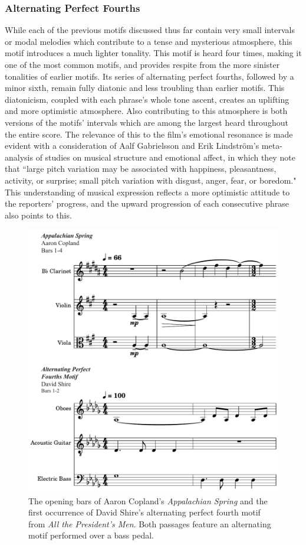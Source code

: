 \subsubsection{Alternating Perfect Fourths
}
While each of the previous motifs discussed thus far contain very small intervals or modal melodies which contribute to a tense and mysterious atmosphere, this motif introduces a much lighter tonality.
This motif is heard four times, making it one of the most common motifs, and provides respite from the more sinister tonalities of earlier motifs.
Its series of alternating perfect fourths, followed by a minor sixth, remain fully diatonic and less troubling than earlier motifs.
This diatonicism, coupled with each phrase's whole tone ascent, creates an uplifting and more optimistic atmosphere.
Also contributing to this atmosphere is both versions of the motifs' intervals which are among the largest heard throughout the entire score.
The relevance of this to the film's emotional resonance is made evident with a consideration of Aalf Gabrielsson and Erik Lindström's meta-analysis of studies on musical structure and emotional affect, in which they note that ``large pitch variation may be associated with happiness, pleasantness, activity, or surprise; small pitch variation with disgust, anger, fear, or boredom."\autocites[][389]{gabrielsson_role_2010}
This understanding of musical expression reflects a more optimistic attitude to the reporters' progress, and the upward progression of each consecutive phrase also points to this.
\begin{figure}
    \centering
    \includegraphics[width=1\linewidth]{img/president-fourths-appal.pdf}
    \caption{The opening bars of Aaron Copland's \textit{Appalachian Spring} and the first occurrence of David Shire's alternating perfect fourth motif from \textit{All the President's Men}. Both passages feature an alternating motif performed over a bass pedal.}
    \label{fig:president-fourths-appal}
\end{figure}

